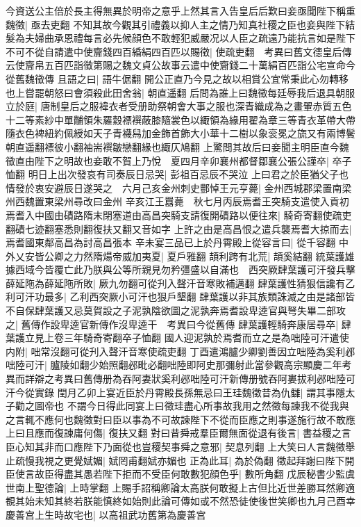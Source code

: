 今資送公主倍於長主得無異於明帝之意乎上然其言入告皇后后歎曰妾亟聞陛下稱重魏徵|{
	亟去吏翻}
不知其故今觀其引禮義以抑人主之情乃知真社稷之臣也妾與陛下結髮為夫婦曲承恩禮每言必先候顔色不敢輕犯威嚴况以人臣之疏遠乃能抗言如是陛下不可不從自請遣中使齎錢四百緍絹四百匹以賜徵|{
	使疏吏翻　考異曰舊文德皇后傳云使齎帛五百匹詣徵第賜之魏文貞公故事云遣中使齎錢二十萬絹百匹詣公宅宣命今從舊魏徵傳}
且語之曰|{
	語牛倨翻}
開公正直乃今見之故以相賞公宜常秉此心勿轉移也上嘗罷朝怒曰會須殺此田舍翁|{
	朝直遥翻}
后問為誰上曰魏徵每廷辱我后退具朝服立於庭|{
	唐制皇后之服褘衣者受册助祭朝會大事之服也深青織成為之畫翬赤質五色十二等素紗中單黼領朱羅縠褾襈蔽膝隨裳色以緅領為緣用翟為章三等青衣革帶大帶隨衣色裨紐約佩綬如天子青襪舄加金飾首飾大小華十二樹以象衮冕之旒又有兩博鬢朝直遥翻褾彼小翻袖耑襈皺戀翻緣也緅仄鳩翻}
上驚問其故后曰妾聞主明臣直今魏徵直由陛下之明故也妾敢不賀上乃悅　夏四月辛卯襄州都督鄒襄公張公謹卒|{
	卒子恤翻}
明日上出次發哀有司奏辰日忌哭|{
	彭祖百忌辰不哭泣}
上曰君之於臣猶父子也情發於衷安避辰日遂哭之　六月己亥金州刺史酆悼王元亨薨|{
	金州西城郡梁置南梁州西魏置東梁州尋改曰金州}
辛亥江王囂薨　秋七月丙辰焉耆王突騎支遣使入貢初焉耆入中國由磧路隋末閉塞道由高昌突騎支請復開磧路以便往來|{
	騎奇寄翻使疏吏翻磧七迹翻塞悉則翻復扶又翻又音如字}
上許之由是高昌恨之遣兵襲焉耆大掠而去|{
	焉耆國東鄰高昌為討高昌張本}
辛未宴三品已上於丹霄殿上從容言曰|{
	從千容翻}
中外乂安皆公卿之力然隋煬帝威加夷夏|{
	夏戶雅翻}
頡利跨有北荒|{
	頡奚結翻}
統葉護雄據西域今皆覆亡此乃朕與公等所親見勿矜彊盛以自滿也　西突厥肆葉護可汗發兵擊薛延陁為薛延陁所敗|{
	厥九勿翻可從刋入聲汗音寒敗補邁翻}
肆葉護性猜狠信讒有乙利可汗功最多|{
	乙利西突厥小可汗也狠戶墾翻}
肆葉護以非其族類誅滅之由是諸部皆不自保肆葉護又忌莫賀設之子泥孰陰欲圖之泥孰奔焉耆設卑逵官與弩失畢二部攻之|{
	舊傳作設卑逵官新傳作沒卑逵干　考異曰今從舊傳}
肆葉護輕騎奔康居尋卒|{
	肆葉護立見上卷三年騎奇寄翻卒子恤翻}
國人迎泥孰於焉耆而立之是為咄陸可汗遣使内附|{
	咄常沒翻可從刋入聲汗音寒使疏吏翻}
丁酉遣鴻臚少卿劉善因立咄陸為奚利邲咄陸可汗|{
	臚陵如翻少始照翻邲毗必翻咄陸即阿史那彌射此當參觀高宗顯慶二年考異而詳辯之考異曰舊傳册為吞阿妻狀奚利邲咄陸可汗新傳册號吞阿婁拔利邲咄陸可汗今從實錄}
閏月乙卯上宴近臣於丹霄殿長孫無忌曰王珪魏徵昔為仇讎|{
	謂其事隱太子勸之圖帝也}
不謂今日得此同宴上曰徵珪盡心所事故我用之然徵每諫我不從我與之言輒不應何也魏徵對曰臣以事為不可故諫陛下不從而臣應之則事遂施行故不敢應上曰且應而復諫庸何傷|{
	復扶又翻}
對曰昔舜戒羣臣爾無面從退有後言|{
	書益稷之言}
臣心知其非而口應陛下乃面從也豈稷契事舜之意邪|{
	契息列翻}
上大笑曰人言魏徵舉止疏慢我視之更覺娬媚|{
	娬罔甫翻娬亦媚也}
正為此耳|{
	為於偽翻}
徵起拜謝曰陛下開臣使言故臣得盡其愚若陛下拒而不受臣何敢數犯顔色乎|{
	數所角翻}
戊辰秘書少監虞世南上聖德論|{
	上時掌翻}
上賜手詔稱卿論太高朕何敢擬上古但比近世差勝耳然卿適覩其始未知其終若朕能慎終如始則此論可傳如或不然恐徒使後世笑卿也九月己酉幸慶善宫上生時故宅也|{
	以高祖武功舊第為慶善宫}


